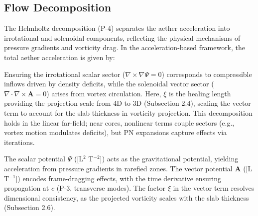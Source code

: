 \subsection{Flow Decomposition}

The Helmholtz decomposition (P-4) separates the aether acceleration into irrotational and solenoidal components, reflecting the physical mechanisms of pressure gradients and vorticity drag. In the acceleration-based framework, the total aether acceleration is given by:

\medskip
\noindent
{}
\medskip

Ensuring the irrotational scalar sector ($\nabla \times \nabla \Psi = 0$) corresponds to compressible inflows driven by density deficits, while the solenoidal vector sector ($\nabla \cdot \nabla \times \mathbf{A} = 0$) arises from vortex circulation. Here, $\xi$ is the healing length providing the projection scale from 4D to 3D (Subsection 2.4), scaling the vector term to account for the slab thickness in vorticity projection. This decomposition holds in the linear far-field; near cores, nonlinear terms couple sectors (e.g., vortex motion modulates deficits), but PN expansions capture effects via iterations.

The scalar potential $\Psi$ ([L$^2$ T$^{-2}$]) acts as the gravitational potential, yielding acceleration from pressure gradients in rarefied zones. The vector potential $\mathbf{A}$ ([L T$^{-1}$]) encodes frame-dragging effects, with the time derivative ensuring propagation at $c$ (P-3, transverse modes). The factor $\xi$ in the vector term resolves dimensional consistency, as the projected vorticity scales with the slab thickness (Subsection 2.6).

